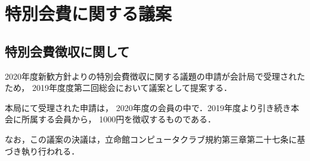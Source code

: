 \section{特別会費に関する議案}
\subsection*{特別会費徴収に関して}

2020年度新歓方針よりの特別会費徴収に関する議題の申請が会計局で受理されたため，
2019年度度第二回総会において議案として提案する．

本局にて受理された申請は，
2020年度の会員の中で．2019年度より引き続き本会に所属する会員から，
1000円を徴収するものである．

なお，この議案の決議は，立命館コンピュータクラブ規約第三章第二十七条に基づき執り行われる．
